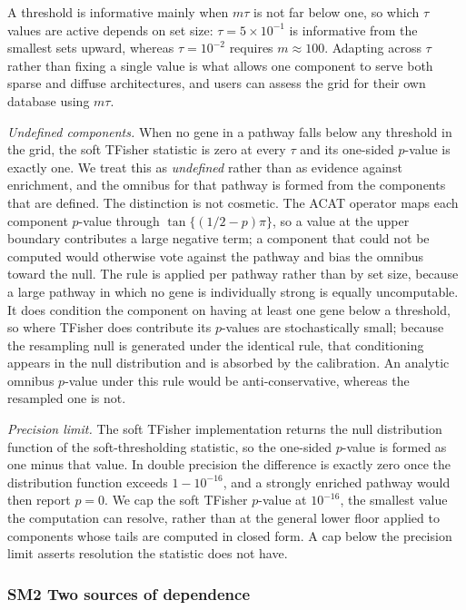 A threshold is informative mainly when \(m\tau\) is not far below one, so which \(\tau\) values are active depends on set size: \(\tau=5\times10^{-1}\) is informative from the smallest sets upward, whereas \(\tau=10^{-2}\) requires \(m\approx100\). Adapting across \(\tau\) rather than fixing a single value is what allows one component to serve both sparse and diffuse architectures, and users can assess the grid for their own database using \(m\tau\).

\smallskip\noindent\textit{Undefined components.} When no gene in a pathway falls below any threshold in the grid, the soft TFisher statistic is zero at every \(\tau\) and its one-sided \(p\)-value is exactly one. We treat this as \emph{undefined} rather than as evidence against enrichment, and the omnibus for that pathway is formed from the components that are defined. The distinction is not cosmetic. The ACAT operator maps each component \(p\)-value through \(\tan\{(1/2-p)\pi\}\), so a value at the upper boundary contributes a large negative term; a component that could not be computed would otherwise vote against the pathway and bias the omnibus toward the null. The rule is applied per pathway rather than by set size, because a large pathway in which no gene is individually strong is equally uncomputable. It does condition the component on having at least one gene below a threshold, so where TFisher does contribute its \(p\)-values are stochastically small; because the resampling null is generated under the identical rule, that conditioning appears in the null distribution and is absorbed by the calibration. An analytic omnibus \(p\)-value under this rule would be anti-conservative, whereas the resampled one is not.

\smallskip\noindent\textit{Precision limit.} The soft TFisher implementation returns the null distribution function of the soft-thresholding statistic, so the one-sided \(p\)-value is formed as one minus that value. In double precision the difference is exactly zero once the distribution function exceeds \(1-10^{-16}\), and a strongly enriched pathway would then report \(p=0\). We cap the soft TFisher \(p\)-value at \(10^{-16}\), the smallest value the computation can resolve, rather than at the general lower floor applied to components whose tails are computed in closed form. A cap below the precision limit asserts resolution the statistic does not have.

\subsubsection*{SM2 Two sources of dependence}

